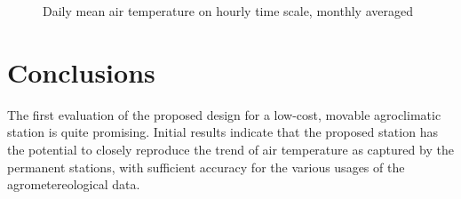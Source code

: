 \documentclass[conference]{IEEEtran}
\begin{document}
\begin{figure}
    \centering
    \hspace{5mm}
    \caption{Daily mean air temperature on hourly time scale, monthly averaged}
    \label{fig:hourly}
\end{figure}

\section{Conclusions}
The first evaluation of the proposed design for a low-cost, movable agroclimatic station is quite promising. Initial results indicate that the proposed station has the potential to closely reproduce the trend of air temperature as captured by the permanent stations, with sufficient  accuracy for the various usages of the agrometereological data.
\end{document}
